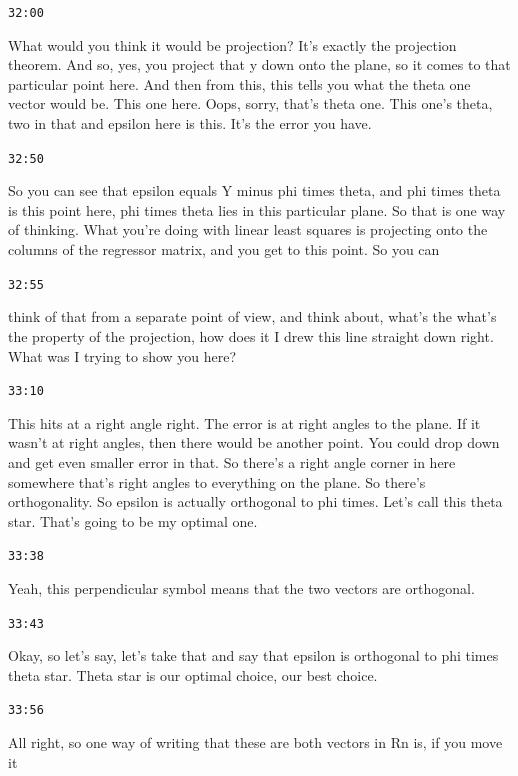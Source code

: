 \documentclass[11pt,a4paper]{article}
\newcommand{\timestamp}[1]{%
  \par\vspace{0.35em}%
  \noindent\colorbox{timestampback}{\textcolor{timestampblue}{\small\texttt{#1}}}%
  \par\vspace{0.2em}%
}
\begin{document}
\timestamp{32:00}

What would you think it would be projection? It's exactly the projection theorem. And so, yes, you project that y down onto the plane, so it comes to that particular point here. And then from this, this tells you what the theta one vector would be. This one here. Oops, sorry, that's theta one. This one's theta, two in that and epsilon here is this. It's the error you have.



\timestamp{32:50}

So you can see that epsilon equals Y minus phi times theta, and phi times theta is this point here, phi times theta lies in this particular plane. So that is one way of thinking. What you're doing with linear least squares is projecting onto the columns of the regressor matrix, and you get to this point. So you can



\timestamp{32:55}

think of that from a separate point of view, and think about, what's the what's the property of the projection, how does it I drew this line straight down right. What was I trying to show you here?



\timestamp{33:10}

This hits at a right angle right. The error is at right angles to the plane. If it wasn't at right angles, then there would be another point. You could drop down and get even smaller error in that. So there's a right angle corner in here somewhere that's right angles to everything on the plane. So there's orthogonality. So epsilon is actually orthogonal to phi times. Let's call this theta star. That's going to be my optimal one.



\timestamp{33:38}

Yeah, this perpendicular symbol means that the two vectors are orthogonal.



\timestamp{33:43}

Okay, so let's say, let's take that and say that epsilon is orthogonal to phi times theta star. Theta star is our optimal choice, our best choice.



\timestamp{33:56}

All right, so one way of writing that these are both vectors in Rn is, if you move it
\end{document}
